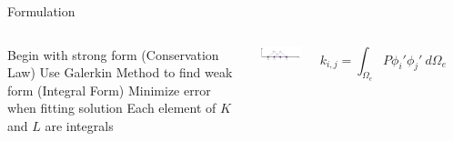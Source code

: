 \begin{frame}{Formulation}
\begin{columns}
\centering
\begin{outline}
  \1 Begin with strong form (Conservation Law)
  \1 Use Galerkin Method to find weak form (Integral Form)
  \1 Minimize error when fitting solution 
  \1 Each element of $K$ and $L$ are integrals
\end{outline}

\centering
\includegraphics[width=5cm]{hat_basis.png}

\vspace{1cm}

$$
k_{i,j} = \int_{\Omega_e} P \phi_i' \phi_j' \ d \Omega_e
$$
\begin{center}
\end{center}
\end{columns}
\end{frame}



